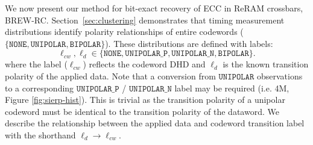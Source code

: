 \label{sec:brew-rc}
We now present our method for bit-exact recovery of ECC in ReRAM crossbars, BREW-RC.
Section~\ref{sec:clustering} demonstrates that timing measurement distributions identify polarity relationships of entire codewords ($\{\texttt{NONE},\texttt{UNIPOLAR}, \texttt{BIPOLAR}\}$). These distributions are defined with labels:
{
\setlength{\abovedisplayskip}{1pt}
\setlength{\belowdisplayskip}{0.5pt}
\begin{equation}
\ell_{cw}, \ell_d \in \{\texttt{NONE}, \texttt{UNIPOLAR\_P}, \texttt{UNIPOLAR\_N}, \texttt{BIPOLAR}\}.
\end{equation}
} 
where the label ($\ell_{cw}$) reflects the codeword DHD and $\ell_d$ is the known transition polarity of the applied data. Note that a conversion from $\texttt{UNIPOLAR}$ observations to a corresponding $\texttt{UNIPOLAR\_P}$ / $ \texttt{UNIPOLAR\_N}$ label may be required (i.e. 4M, Figure \ref{fig:sierp-hist}). This is trivial as the transition polarity of a unipolar codeword must be identical to the transition polarity of the dataword. We describe the relationship between the applied data and codeword transition label with the shorthand $\ell_{d} \rightarrow\ell_{cw}$.


